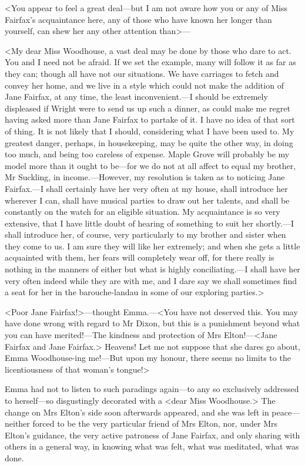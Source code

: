 <You appear to feel a great deal—but I am not aware how you or any of Miss Fairfax's acquaintance here, any of those who have known her longer than yourself, can shew her any other attention than>—

<My dear Miss Woodhouse, a vast deal may be done by those who dare to act. You and I need not be afraid. If we set the example, many will follow it as far as they can; though all have not our situations. We have carriages to fetch and convey her home, and we live in a style which could not make the addition of Jane Fairfax, at any time, the least inconvenient.—I should be extremely displeased if Wright were to send us up such a dinner, as could make me regret having asked more than Jane Fairfax to partake of it. I have no idea of that sort of thing. It is not likely that I should, considering what I have been used to. My greatest danger, perhaps, in housekeeping, may be quite the other way, in doing too much, and being too careless of expense. Maple Grove will probably be my model more than it ought to be—for we do not at all affect to equal my brother, Mr Suckling, in income.—However, my resolution is taken as to noticing Jane Fairfax.—I shall certainly have her very often at my house, shall introduce her wherever I can, shall have musical parties to draw out her talents, and shall be constantly on the watch for an eligible situation. My acquaintance is so very extensive, that I have little doubt of hearing of something to suit her shortly.—I shall introduce her, of course, very particularly to my brother and sister when they come to us. I am sure they will like her extremely; and when she gets a little acquainted with them, her fears will completely wear off, for there really is nothing in the manners of either but what is highly conciliating.—I shall have her very often indeed while they are with me, and I dare say we shall sometimes find a seat for her in the barouche-landau in some of our exploring parties.>

<Poor Jane Fairfax!>—thought Emma.—<You have not deserved this. You may have done wrong with regard to Mr Dixon, but this is a punishment beyond what you can have merited!—The kindness and protection of Mrs Elton!—<Jane Fairfax and Jane Fairfax.> Heavens! Let me not suppose that she dares go about, Emma Woodhouse-ing me!—But upon my honour, there seems no limits to the licentiousness of that woman's tongue!>

Emma had not to listen to such paradings again—to any so exclusively addressed to herself—so disgustingly decorated with a <dear Miss Woodhouse.> The change on Mrs Elton's side soon afterwards appeared, and she was left in peace—neither forced to be the very particular friend of Mrs Elton, nor, under Mrs Elton's guidance, the very active patroness of Jane Fairfax, and only sharing with others in a general way, in knowing what was felt, what was meditated, what was done.

